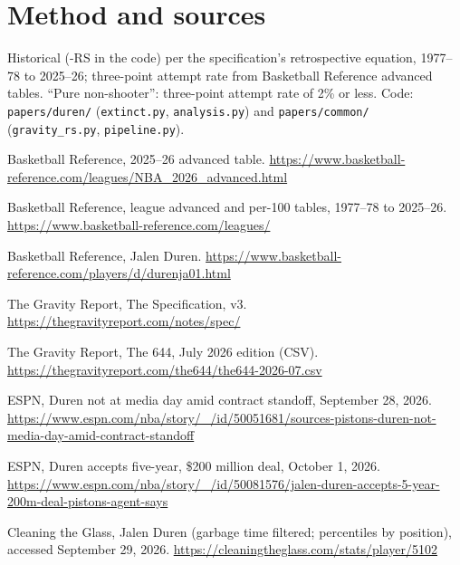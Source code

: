 \documentclass[11pt]{article}
\begin{document}
\forecastscale
{}

\medskip\noindent{\footnotesize\textcolor{steel}{External predictions are graded on Basketball
Reference's final regular-season tables by April 30, 2027. Registered October 17, 2026, before
the October 18 freeze. Scored by Brier score in the Forecast Ledger.}}

\enlargethispage{1\baselineskip}
\section*{Method and sources}
\footnotesize
\gravity{} Historical (\gravity-RS in the code) per the specification's retrospective equation, 1977--78
to 2025--26; three-point attempt rate from Basketball Reference advanced tables. ``Pure
non-shooter'': three-point attempt rate of 2\% or less. Code: \texttt{papers/duren/} (\texttt{extinct.py}, \texttt{analysis.py}) and
\texttt{papers/common/} (\texttt{gravity\_rs.py}, \texttt{pipeline.py}).
\begin{enumerate}[label={[\arabic*]},nosep]
\item Basketball Reference, 2025--26 advanced table. \url{https://www.basketball-reference.com/leagues/NBA_2026_advanced.html}
\item Basketball Reference, league advanced and per-100 tables, 1977--78 to 2025--26. \url{https://www.basketball-reference.com/leagues/}
\item Basketball Reference, Jalen Duren. \url{https://www.basketball-reference.com/players/d/durenja01.html}
\item The Gravity Report, The \gravity{} Specification, v3. \url{https://thegravityreport.com/notes/spec/}
\item The Gravity Report, The 644, July 2026 edition (CSV). \url{https://thegravityreport.com/the644/the644-2026-07.csv}
\item ESPN, Duren not at media day amid contract standoff, September 28, 2026. \url{https://www.espn.com/nba/story/_/id/50051681/sources-pistons-duren-not-media-day-amid-contract-standoff}
\item ESPN, Duren accepts five-year, \$200 million deal, October 1, 2026. \url{https://www.espn.com/nba/story/_/id/50081576/jalen-duren-accepts-5-year-200m-deal-pistons-agent-says}
\item Cleaning the Glass, Jalen Duren (garbage time filtered; percentiles by position), accessed September 29, 2026. \url{https://cleaningtheglass.com/stats/player/5102}
\end{enumerate}
\end{document}
